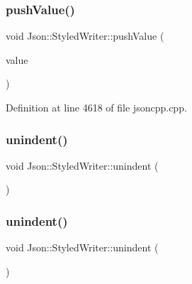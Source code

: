 \hypertarget{class_json_1_1_styled_writer_a236a833b4bdaa09915c2cac715970f08}{}\label{class_json_1_1_styled_writer_a236a833b4bdaa09915c2cac715970f08} 
\subsubsection{\texorpdfstring{push\+Value()}{pushValue()}\hspace{0.1cm}{\footnotesize\ttfamily [2/2]}}
{\footnotesize\ttfamily void Json\+::\+Styled\+Writer\+::push\+Value (\begin{DoxyParamCaption}\item[{const \hyperlink{config_8h_a1e723f95759de062585bc4a8fd3fa4be}{J\+S\+O\+N\+C\+P\+P\+\_\+\+S\+T\+R\+I\+NG} \&}]{value }\end{DoxyParamCaption})\hspace{0.3cm}{\ttfamily [private]}}



Definition at line 4618 of file jsoncpp.\+cpp.

\hypertarget{class_json_1_1_styled_writer_acee1c9285519b573cfcb00b7e7f5a809}{}\label{class_json_1_1_styled_writer_acee1c9285519b573cfcb00b7e7f5a809} 
\subsubsection{\texorpdfstring{unindent()}{unindent()}\hspace{0.1cm}{\footnotesize\ttfamily [1/2]}}
{\footnotesize\ttfamily void Json\+::\+Styled\+Writer\+::unindent (\begin{DoxyParamCaption}{ }\end{DoxyParamCaption})\hspace{0.3cm}{\ttfamily [private]}}

\hypertarget{class_json_1_1_styled_writer_acee1c9285519b573cfcb00b7e7f5a809}{}\label{class_json_1_1_styled_writer_acee1c9285519b573cfcb00b7e7f5a809} 
\subsubsection{\texorpdfstring{unindent()}{unindent()}\hspace{0.1cm}{\footnotesize\ttfamily [2/2]}}
{\footnotesize\ttfamily void Json\+::\+Styled\+Writer\+::unindent (\begin{DoxyParamCaption}{ }\end{DoxyParamCaption})\hspace{0.3cm}{\ttfamily [private]}}



